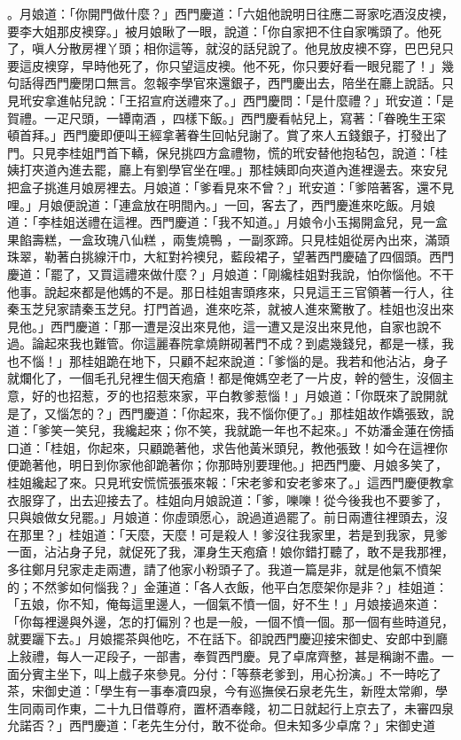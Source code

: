 。月娘道：「你開門做什麼？」西門慶道：「六姐他說明日往應二哥家吃酒沒皮襖，要李大姐那皮襖穿。」被月娘瞅了一眼，說道：「你自家把不住自家嘴頭了。他死了，嗔人分散房裡丫頭；相你這等，就沒的話兒說了。他見放皮襖不穿，巴巴兒只要這皮襖穿，早時他死了，你只望這皮襖。他不死，你只要好看一眼兒罷了！」幾句話得西門慶閉口無言。忽報李學官來還銀子，西門慶出去，陪坐在廳上說話。只見玳安拿進帖兒說：「王招宣府送禮來了。」西門慶問：「是什麼禮？」玳安道：「是賀禮。一疋尺頭，一罈南酒 ，四樣下飯。」西門慶看帖兒上，寫著：「眷晚生王寀頓首拜。」西門慶即便叫王經拿著眷生回帖兒謝了。賞了來人五錢銀子，打發出了門。只見李桂姐門首下轎，保兒挑四方盒禮物，慌的玳安替他抱毡包，說道：「桂姨打夾道內進去罷，廳上有劉學官坐在哩。」那桂姨即向夾道內進裡邊去。來安兒把盒子挑進月娘房裡去。月娘道：「爹看見來不曾？」玳安道：「爹陪著客，還不見哩。」月娘便說道：「連盒放在明間內。」一回，客去了，西門慶進來吃飯。月娘道：「李桂姐送禮在這裡。西門慶道：「我不知道。」月娘令小玉揭開盒兒，見一盒果餡壽糕，一盒玫瑰八仙糕 ，兩隻燒鴨 ，一副豕蹄。只見桂姐從房內出來，滿頭珠翠，勒著白挑線汗巾，大紅對衿襖兒，藍段裙子，望著西門慶磕了四個頭。西門慶道：「罷了，又買這禮來做什麼？」月娘道：「剛纔桂姐對我說，怕你惱他。不干他事。說起來都是他媽的不是。那日桂姐害頭疼來，只見這王三官領著一行人，往秦玉芝兒家請秦玉芝兒。打門首過，進來吃茶，就被人進來驚散了。桂姐也沒出來見他。」西門慶道：「那一遭是沒出來見他，這一遭又是沒出來見他，自家也說不過。論起來我也難管。你這麗春院拿燒餅砌著門不成？到處幾錢兒，都是一樣，我也不惱！」那桂姐跪在地下，只顧不起來說道：「爹惱的是。我若和他沾沾，身子就爛化了，一個毛孔兒裡生個天疱瘡！都是俺媽空老了一片皮，幹的營生，沒個主意，好的也招惹，歹的也招惹來家，平白教爹惹惱！」月娘道：「你既來了說開就是了，又惱怎的？」西門慶道：「你起來，我不惱你便了。」那桂姐故作嬌張致，說道：「爹笑一笑兒，我纔起來；你不笑，我就跪一年也不起來。」不妨潘金蓮在傍插口道：「桂姐，你起來，只顧跪著他，求告他黃米頭兒，教他張致！如今在這裡你便跪著他，明日到你家他卻跪著你；你那時別要理他。」把西門慶、月娘多笑了，桂姐纔起了來。只見玳安慌慌張張來報：「宋老爹和安老爹來了。」這西門慶便教拿衣服穿了，出去迎接去了。桂姐向月娘說道：「爹，嚛嚛！從今後我也不要爹了，只與娘做女兒罷。」月娘道：你虛頭愿心，說過道過罷了。前日兩遭往裡頭去，沒在那里？」桂姐道：「天麼，天麼！可是殺人！爹沒往我家里，若是到我家，見爹一面，沾沾身子兒，就促死了我，渾身生天疱瘡！娘你錯打聽了，敢不是我那裡，多往鄭月兒家走走兩遭，請了他家小粉頭子了。我道一篇是非，就是他氣不憤架的；不然爹如何惱我？」金蓮道：「各人衣飯，他平白怎麼架你是非？」桂姐道：「五娘，你不知，俺每這里邊人，一個氣不憤一個，好不生！」月娘接過來道：「你每裡邊與外邊，怎的打偏別？也是一般，一個不憤一個。那一個有些時道兒，就要躧下去。」月娘擺茶與他吃，不在話下。卻說西門慶迎接宋御史、安郎中到廳上敍禮，每人一疋段子，一部書，奉賀西門慶。見了卓席齊整，甚是稱謝不盡。一面分賓主坐下，叫上戲子來參見。分付：「等蔡老爹到，用心扮演。」不一時吃了茶，宋御史道：「學生有一事奉凟四泉，今有巡撫侯石泉老先生，新陞太常卿，學生同兩司作東，二十九日借尊府，置杯酒奉餞，初二日就起行上京去了，未審四泉允諾否？」西門慶道：「老先生分付，敢不從命。但未知多少卓席？」宋御史道